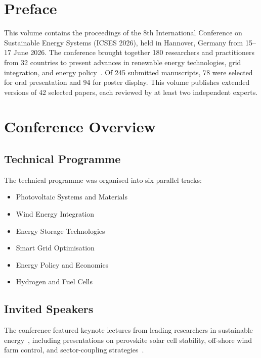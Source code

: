 \documentclass[
    language=english,
    doctype=proceedings,
    institution=none,
]{../../omnilatex}
\begin{document}
\maketitle

\section*{Preface}
This volume contains the proceedings of the 8th International Conference on
Sustainable Energy Systems (ICSES 2026), held in Hannover, Germany from
15--17 June 2026.  The conference brought together 180 researchers and
practitioners from 32 countries to present advances in renewable energy
technologies, grid integration, and energy policy~\cite{bibid}.  Of 245
submitted manuscripts, 78 were selected for oral presentation and 94 for poster
display.
This volume publishes extended versions of 42 selected papers, each reviewed by
at least two independent experts.

\tableofcontents

\section{Conference Overview}

\subsection{Technical Programme}
The technical programme was organised into six parallel tracks:
\begin{itemize}
    \item Photovoltaic Systems and Materials
    \item Wind Energy Integration
    \item Energy Storage Technologies
    \item Smart Grid Optimisation
    \item Energy Policy and Economics
    \item Hydrogen and Fuel Cells
\end{itemize}

\subsection{Invited Speakers}
The conference featured keynote lectures from leading researchers in sustainable
energy~\cite{einstein1905}, including presentations on perovskite solar cell
stability, off-shore wind farm control, and sector-coupling
strategies~\cite{goossensLaTeXCompanion1993}.
\end{document}
